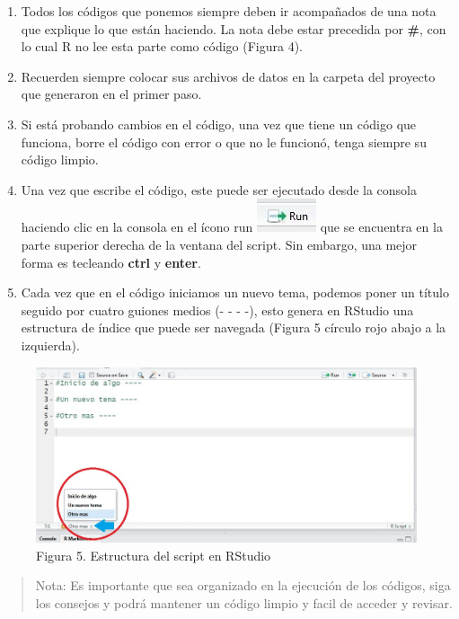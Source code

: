 \documentclass[]{article}
\begin{document}
\begin{enumerate}
\def\labelenumi{\alph{enumi}.}
\item
  Todos los códigos que ponemos siempre deben ir acompañados de una nota
  que explique lo que están haciendo. La nota debe estar precedida por
  \textbf{\#}, con lo cual R no lee esta parte como código (Figura 4).
\item
  Recuerden siempre colocar sus archivos de datos en la carpeta del
  proyecto que generaron en el primer paso.
\item
  Si está probando cambios en el código, una vez que tiene un código que
  funciona, borre el código con error o que no le funcionó, tenga
  siempre su código limpio.
\item
  Una vez que escribe el código, este puede ser ejecutado desde la
  consola haciendo clic en la consola en el ícono run
  \includegraphics{imagen/RStudio_Run.jpg} que se encuentra en la parte
  superior derecha de la ventana del script. Sin embargo, una mejor
  forma es tecleando \textbf{ctrl} y \textbf{enter}.
\item
  Cada vez que en el código iniciamos un nuevo tema, podemos poner un
  título seguido por cuatro guiones medios (- - - -), esto genera en
  RStudio una estructura de índice que puede ser navegada (Figura 5
  círculo rojo abajo a la izquierda).
\end{enumerate}

\begin{figure}[htbp]
\centering
\includegraphics{imagen/estructura.jpg}
\caption{Figura 5. Estructura del script en RStudio}
\end{figure}

\begin{quote}
Nota: Es importante que sea organizado en la ejecución de los códigos,
siga los consejos y podrá mantener un código limpio y facil de acceder y
revisar.
\end{quote}
\end{document}
